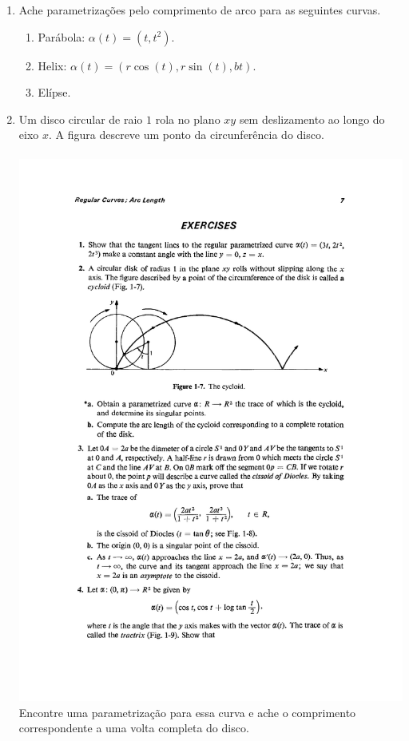 \documentclass[12pt,a4paper,oneside]{book}
\begin{document}
\begin{enumerate}

\item Ache parametriza\c c\~oes pelo comprimento de arco para as seguintes curvas.
\begin{enumerate}
\item Par\'abola: $\alpha(t)=(t,t^2)$.
\item Helix: $\alpha(t)=(r\cos(t),r\sin(t),bt)$.
\item El\'ipse.
\end{enumerate}

\item Um disco circular de raio $1$ rola no plano $xy$ sem deslizamento ao longo do eixo $x$.
	A figura descreve um ponto da circunfer\^encia do disco. \\
	 \ \\
	\includegraphics[scale=0.8]{cicloide}\\
	Encontre uma parametriza\c c\~ao para essa curva e ache o comprimento correspondente a uma 
	volta completa do disco.


\end{enumerate}
\end{document}
